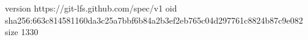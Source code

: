 version https://git-lfs.github.com/spec/v1
oid sha256:663c814581160da3c25a7bbf6b84a2b3ef2eb765c04d297761c8824b87c9e082
size 1330
